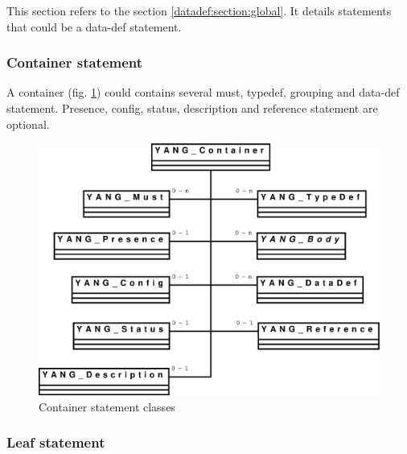 \documentclass[a4paper]{article}
\begin{document}
This  section refers to  the section  \ref{datadef:section:global}. It
details statements that could be a data-def statement.

\subsubsection{Container statement}

A  container  (fig.  \ref{container})  could  contains  several  must,
typedef,  grouping and data-def  statement. Presence,  config, status,
description and reference statement are optional.
\begin{figure}[htbp]
\begin{center}
\includegraphics[scale = .3]{container.eps}
\end{center}
\caption{Container statement classes}
\label{container}
\end{figure}

\subsubsection{Leaf statement}
\end{document}
